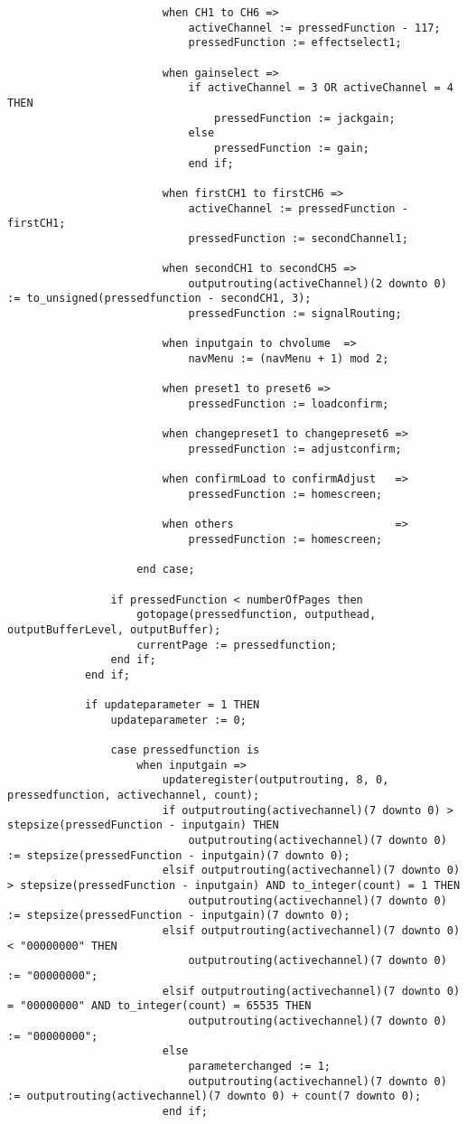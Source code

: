 \begin{lstlisting}
						when CH1 to CH6 => 	
							activeChannel := pressedFunction - 117;
							pressedFunction := effectselect1;

						when gainselect	=> 	
							if activeChannel = 3 OR activeChannel = 4 THEN
								pressedFunction := jackgain;
							else
								pressedFunction := gain;
							end if;		

						when firstCH1 to firstCH6 => 	
							activeChannel := pressedFunction - firstCH1;
							pressedFunction := secondChannel1;
																		
						when secondCH1 to secondCH5	=> 	
							outputrouting(activeChannel)(2 downto 0) := to_unsigned(pressedfunction - secondCH1, 3); 
							pressedFunction := signalRouting;

						when inputgain to chvolume	=>
							navMenu := (navMenu + 1) mod 2;

						when preset1 to preset6	=> 	
							pressedFunction := loadconfirm;

						when changepreset1 to changepreset6	=> 	
							pressedFunction := adjustconfirm;

						when confirmLoad to confirmAdjust	=> 	
							pressedFunction := homescreen;

						when others							=> 	
							pressedFunction := homescreen;

					end case;
				
				if pressedFunction < numberOfPages then
					gotopage(pressedfunction, outputhead, outputBufferLevel, outputBuffer);
					currentPage := pressedfunction;	
				end if;
			end if;
			
			if updateparameter = 1 THEN
				updateparameter := 0;

				case pressedfunction is
					when inputgain =>
						updateregister(outputrouting, 8, 0, pressedfunction, activechannel, count);
						if outputrouting(activechannel)(7 downto 0) > stepsize(pressedFunction - inputgain) THEN
							outputrouting(activechannel)(7 downto 0) := stepsize(pressedFunction - inputgain)(7 downto 0);
						elsif outputrouting(activechannel)(7 downto 0) > stepsize(pressedFunction - inputgain) AND to_integer(count) = 1 THEN
							outputrouting(activechannel)(7 downto 0) := stepsize(pressedFunction - inputgain)(7 downto 0);
						elsif outputrouting(activechannel)(7 downto 0) < "00000000" THEN
							outputrouting(activechannel)(7 downto 0) := "00000000";
						elsif outputrouting(activechannel)(7 downto 0) = "00000000" AND to_integer(count) = 65535 THEN
							outputrouting(activechannel)(7 downto 0) := "00000000";
						else
							parameterchanged := 1;
							outputrouting(activechannel)(7 downto 0) := outputrouting(activechannel)(7 downto 0) + count(7 downto 0);
						end if;


\end{lstlisting}
